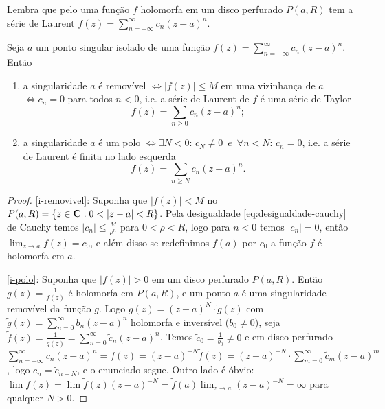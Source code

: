 Lembra que 
pelo 
uma função $f$ holomorfa em um disco perfurado $P(a,R)$
tem a série de Laurent $f(z) = \sum_{n=-\infty}^\infty c_n (z-a)^n$.


\begin{teorema}[Riemann]
\label{t:riemann-isolados}
Seja $a$ um ponto singular isolado de uma função
$f(z) = \sum_{n=-\infty}^\infty c_n (z-a)^n$.
Então
\begin{enumerate}
\item \label{i-removivel} a singularidade $a$ é removível
$\iff |f(z)|\leq M$ em uma vizinhança de $a$
$\iff c_n = 0$ para todos $n<0$, i.e. a série de Laurent de $f$ é uma série de Taylor
\[ f(z) = \sum_{n\geq 0} c_n (z-a)^n; \]
\item \label{i-polo} a singularidade $a$ é um polo
$\iff \exists N<0: \, c_{N}\neq 0 \,\textit{ e }\, \forall n<N:\, c_n = 0$,
i.e. a série de Laurent é finita no lado esquerda
\[ f(z) = \sum_{n\geq N} c_n (z-a)^n . \]
\end{enumerate}
\end{teorema}
\begin{proof}
\eqref{i-removivel}: Suponha que $|f(z)|<M$ no $P(a,R) = \{z\in\C: 0<|z-a|<R\}$.
Pela desigualdade \eqref{eq:desigualdade-cauchy} de Cauchy temos
$|c_n| \leq \frac{M}{\rho^n}$ para $0<\rho<R$,
logo para $n<0$ temos $|c_n|=0$, então $\lim_{z\to a} f(z) = c_0$,
e além disso se redefinimos $f(a)$ por $c_0$ a função $f$ é holomorfa em $a$.

\eqref{i-polo}: Suponha que $|f(z)|>0$ em um disco perfurado $P(a,R)$.
Então $g(z) = \frac{1}{f(z)}$ é holomorfa em $P(a,R)$,
e um ponto $a$ é uma singularidade removível da função $g$.
Logo $g(z) = (z-a)^N \cdot \tilde{g}(z)$ com
$\tilde{g}(z) = \sum_{n=0}^\infty b_n (z-a)^n$ holomorfa e inversível ($b_0\neq 0$),
seja $\tilde{f}(z) = \frac{1}{\tilde{g}(z)} = \sum_{n=0}^\infty \tilde{c}_n (z-a)^n$.
Temos $\tilde{c}_0 = \frac{1}{b_0}\neq 0$ e em disco perfurado
$\sum_{n=-\infty}^\infty c_n (z-a)^n =
f(z) = (z-a)^{-N} \tilde{f}(z) = (z-a)^{-N}\cdot \sum_{m=0}^\infty \tilde{c}_m (z-a)^m$,
logo $c_n = \tilde{c}_{n+N}$, e o enunciado segue. Outro lado é óbvio:
$\lim f(z) = \lim \tilde{f}(z) (z-a)^{-N} = \tilde{f}(a) \lim_{z\to a} (z-a)^{-N} = \infty$ para qualquer $N>0$.
\end{proof}


